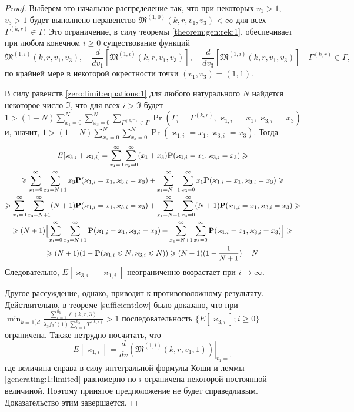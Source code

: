 \documentclass[a4paper,12pt,russian]{extarticle}
\begin{document}
\begin{proof}
Выберем это начальное распределение так, что при некоторых $v_1 >1$, $v_3 >1$ будет выполнено неравенство $\mathfrak{M}^{(1,0)}(k,r,v_1,v_3) <\infty$ для всех $\Gamma^{(k,r)}\in \Gamma$. Это ограничение, в силу теоремы \eqref{theorem:gen:rek:1}, обеспечивает при любом конечном $i\geqslant 0$ существование функций 
\begin{equation}
\mathfrak{M}^{(1,i)}(k,r,v_1,v_3),\quad \frac{d}{dv_1} \left[\mathfrak{M}^{(1,i)}(k,r,v_1,v_3)\right], \quad \frac{d}{dv_3} \left[\mathfrak{M}^{(1,i)}(k,r,v_1,v_3)\right] \quad \Gamma^{(k,r)} \in \Gamma,
\end{equation}
по крайней мере в некоторой окрестности точки $(v_1, v_3)=(1,1)$.

В силу равенств \eqref{zero:limit:equations:1} для любого натурального $N$ найдется некоторое число $\mathfrak{I}$, что для всех $i > \mathfrak{I}$ будет
$1 > (1+N) \sum_{x_1=0}^{N}\sum_{x_3=0}^{N} \sum_{\Gamma^{(k,r)}\in \Gamma}  \Pr(\Gamma_{i}=\Gamma^{(k,r)}, \varkappa_{1,i} = x_1, \varkappa_{3,i}=x_3)$ и, значит, $1 >(1+N) \sum_{x_1=0}^{N}\sum_{x_3=0}^{N} \Pr(\varkappa_{1,i} = x_1, \varkappa_{3,i}=x_3)$. Тогда
\begin{multline*}
E[\varkappa_{3,i}+\varkappa_{1,i}] = \sum_{x_1=0}^{\infty}\sum_{x_3=0}^{\infty} (x_1 + x_3) \Pr(\varkappa_{1,i} = x_1, \varkappa_{3,i}=x_3) \geqslant \\
\geqslant
 \sum_{x_1=0}^{\infty}\sum_{x_3=N+1}^{\infty} x_3 \Pr(\varkappa_{1,i} = x_1, \varkappa_{3,i}=x_3) +  \sum_{x_1=N+1}^{\infty}\sum_{x_3=0}^{\infty} x_1 \Pr(\varkappa_{1,i} = x_1, \varkappa_{3,i}=x_3) \geqslant \\
 \geqslant
  \sum_{x_1=0}^{\infty}\sum_{x_3=N+1}^{\infty} (N+1) \Pr(\varkappa_{1,i} = x_1, \varkappa_{3,i}=x_3) +  \sum_{x_1=N+1}^{\infty}\sum_{x_3=0}^{\infty} (N+1) \Pr(\varkappa_{1,i} = x_1, \varkappa_{3,i}=x_3)\geqslant \\
  \geqslant
  (N+1)\Bigl[\sum_{x_1=0}^{\infty}\sum_{x_3=N+1}^{\infty} \Pr(\varkappa_{1,i} = x_1, \varkappa_{3,i}=x_3) +  \sum_{x_1=N+1}^{\infty}\sum_{x_3=0}^{\infty}\Pr(\varkappa_{1,i} = x_1, \varkappa_{3,i}=x_3)\Bigr] \geqslant \\
  \geqslant (N+1)(1-\Pr(\varkappa_{1,i} \leqslant N, \varkappa_{3,i} \leqslant N)  ) 
  \geqslant 
  (N+1)(1-\frac{1}{N+1}) = N
\end{multline*}
Следовательно, $E[\varkappa_{3,i}+\varkappa_{1,i}]$ неограниченно возрастает при $i \to \infty$.

Другое рассуждение, однако, приводит к противоположному результату. Действительно, в теореме \eqref{sufficient:low} было доказано, что  при $\min_{k=\overline{1,d}} { \frac{\sum_{r = 1}^{n_k} \ell(k,r,3) }{\lambda_3 f_3'(1) \sum_{r=1}^{n_k} T^{(k,r)} }}>1$ последовательность $\{E[\varkappa_{3,i}]; i \geqslant 0\}$ ограничена. Также нетрудно посчитать, что
$$
E[\varkappa_{1,i}] = \frac{d}{dv}\left.\left(\mathfrak{M}^{(1,i)}(k,r,v_1,1)\right)\right|_{v_1=1}
$$
где величина справа в силу интегральной формулы Коши и леммы \ref{generating:1:limited} равномерно по $i$ ограничена некоторой постоянной величиной. 
 Поэтому принятое предположение не будет справедливым. Доказательство этим завершается.
\end{proof}
\end{document}
